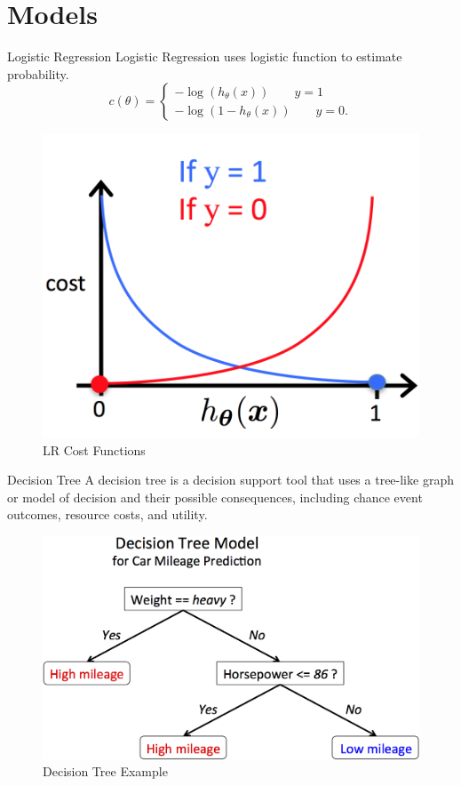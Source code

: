 \documentclass{beamer}
\begin{document}
\section{Models}

\begin{frame}{Logistic Regression}
Logistic Regression uses logistic function to estimate probability. 
$$
c(\theta) = 
\begin{cases}
- \log(h_{\theta}(x)) \quad \quad y = 1 \\
- \log (1 - h_{\theta}(x)) \quad \quad y = 0. 
\end{cases}
$$

\begin{figure}
  \includegraphics[width=0.6\linewidth]{pic/cost_lr.png}
  \caption{LR Cost Functions}
  \label{fig:cost_lr}
\end{figure}

\end{frame}

\begin{frame}{Decision Tree}
A decision tree is a decision support tool that uses a tree-like graph or model of decision and their possible consequences, including chance event outcomes, resource costs, and utility.
\begin{figure}
  \includegraphics[width=0.6\linewidth]{pic/decision_trees.png}
  \caption{Decision Tree Example}
  \label{fig:dr_eg}
\end{figure}
\end{frame}
\end{document}
